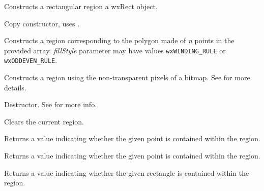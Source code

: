 Constructs a rectangular region a wxRect object.


Copy constructor, uses .


Constructs a region corresponding to the polygon made of {\it n} points in the
provided array. {\it fillStyle} parameter may have values
{\tt wxWINDING\_RULE} or {\tt wxODDEVEN\_RULE}.



Constructs a region using the non-transparent pixels of a bitmap.  See
 for more details.



\label{wxregiondtor}


Destructor.
See  for more info.


\label{wxregionclear}


Clears the current region.


\label{wxregioncontains}


Returns a value indicating whether the given point is contained within the region.


Returns a value indicating whether the given point is contained within the region.


Returns a value indicating whether the given rectangle is contained within the region.


